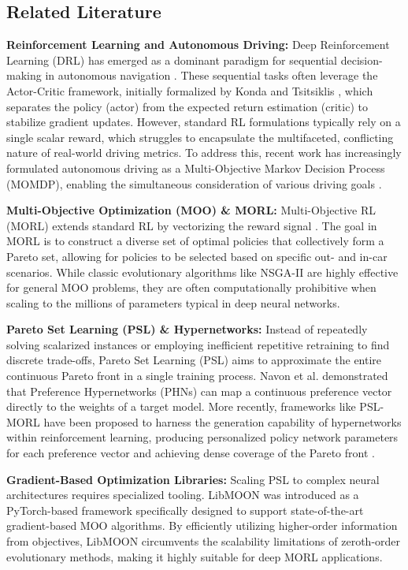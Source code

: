 \documentclass[12pt, letterpaper]{article}
\begin{document}
\subsection{Related Literature}

\textbf{Reinforcement Learning and Autonomous Driving:} 
Deep Reinforcement Learning (DRL) has emerged as a dominant paradigm for sequential decision-making in autonomous navigation \cite{kiran2021deep}. These sequential tasks often leverage the Actor-Critic framework, initially formalized by Konda and Tsitsiklis \cite{konda2000actor}, which separates the policy (actor) from the expected return estimation (critic) to stabilize gradient updates. However, standard RL formulations typically rely on a single scalar reward, which struggles to encapsulate the multifaceted, conflicting nature of real-world driving metrics. To address this, recent work has increasingly formulated autonomous driving as a Multi-Objective Markov Decision Process (MOMDP), enabling the simultaneous consideration of various driving goals \cite{agbaje2024neuroaction}.

\textbf{Multi-Objective Optimization (MOO) \& MORL:} 
Multi-Objective RL (MORL) extends standard RL by vectorizing the reward signal \cite{hayes2022practical}. The goal in MORL is to construct a diverse set of optimal policies that collectively form a Pareto set, allowing for policies to be selected based on specific out- and in-car scenarios. While classic evolutionary algorithms like NSGA-II \cite{deb2002fast} are highly effective for general MOO problems, they are often computationally prohibitive when scaling to the millions of parameters typical in deep neural networks.

\textbf{Pareto Set Learning (PSL) \& Hypernetworks:} 
Instead of repeatedly solving scalarized instances or employing inefficient repetitive retraining to find discrete trade-offs, Pareto Set Learning (PSL) aims to approximate the entire continuous Pareto front in a single training process. Navon et al. \cite{navon2020learning} demonstrated that Preference Hypernetworks (PHNs) can map a continuous preference vector directly to the weights of a target model. More recently, frameworks like PSL-MORL have been proposed to harness the generation capability of hypernetworks within reinforcement learning, producing personalized policy network parameters for each preference vector and achieving dense coverage of the Pareto front \cite{liu2025pareto}. 

\textbf{Gradient-Based Optimization Libraries:} 
Scaling PSL to complex neural architectures requires specialized tooling. LibMOON \cite{zhang2024libmoon} was introduced as a PyTorch-based framework specifically designed to support state-of-the-art gradient-based MOO algorithms. By efficiently utilizing higher-order information from objectives, LibMOON circumvents the scalability limitations of zeroth-order evolutionary methods, making it highly suitable for deep MORL applications.
\end{document}
